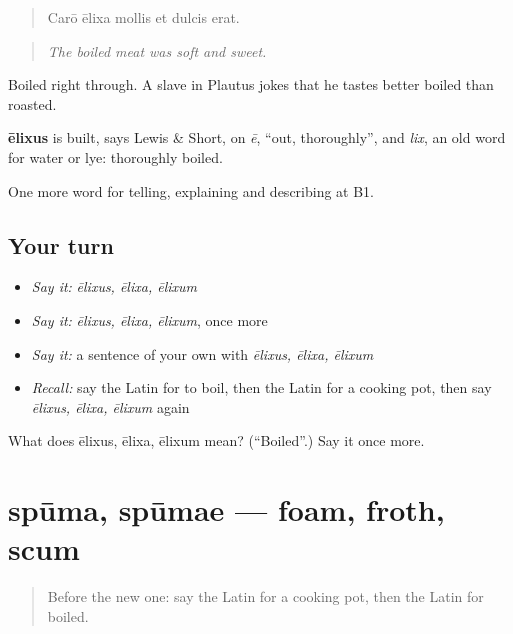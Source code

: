 \begin{quote}
Carō ēlixa mollis et dulcis erat.
\end{quote}

\begin{quote}
\emph{The boiled meat was soft and sweet.}
\end{quote}

Boiled right through. A slave in Plautus jokes that he tastes better boiled than roasted.

\begin{cousinweb}
\textbf{ēlixus} is built, says Lewis \& Short, on \emph{ē}, \textquotedblleft{}out, thoroughly\textquotedblright{}, and \emph{lix}, an old word for water or lye: thoroughly boiled.
\end{cousinweb}

\begin{grammarlens}[title={What you've built}]
One more word for telling, explaining and describing at B1.
\end{grammarlens}

\subsection*{Your turn}
\begin{itemize}
\raggedright
  \item \emph{Say it:} \emph{ēlixus, ēlixa, ēlixum}
  \item \emph{Say it:} \emph{ēlixus, ēlixa, ēlixum}, once more
  \item \emph{Say it:} a sentence of your own with \emph{ēlixus, ēlixa, ēlixum}
  \item \emph{Recall:} say the Latin for to boil, then the Latin for a cooking pot, then say \emph{ēlixus, ēlixa, ēlixum} again
\end{itemize}

\begin{tcolorbox}[breakable,colback=teal!4,colframe=teal!35!black,title={Before you move on}]
What does ēlixus, ēlixa, ēlixum mean? (\textquotedblleft{}Boiled\textquotedblright{}.) Say it once more.
\end{tcolorbox}
\section[spūma, spūmae]{spūma, spūmae — foam, froth, scum}

\label{lesson:LA-C353-spuma}



\begin{quote}
Before the new one: say the Latin for a cooking pot, then the Latin for boiled.
\end{quote}

